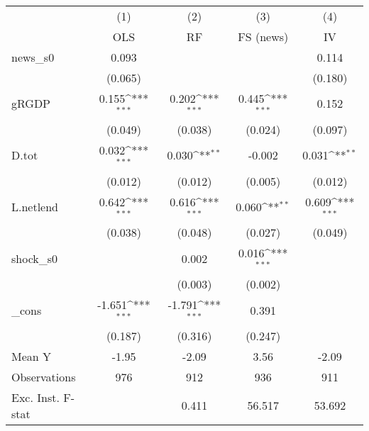 {
\def\sym#1{\ifmmode^{#1}\else\(^{#1}\)\fi}
\begin{tabular}{l*{4}{c}}
\toprule
            &\multicolumn{1}{c}{(1)}&\multicolumn{1}{c}{(2)}&\multicolumn{1}{c}{(3)}&\multicolumn{1}{c}{(4)}\\
            &\multicolumn{1}{c}{OLS}&\multicolumn{1}{c}{RF}&\multicolumn{1}{c}{FS (news)}&\multicolumn{1}{c}{IV}\\
\midrule
news\_s0     &       0.093         &                     &                     &       0.114         \\
            &     (0.065)         &                     &                     &     (0.180)         \\
\addlinespace
gRGDP       &       0.155\sym{***}&       0.202\sym{***}&       0.445\sym{***}&       0.152         \\
            &     (0.049)         &     (0.038)         &     (0.024)         &     (0.097)         \\
\addlinespace
D.tot       &       0.032\sym{***}&       0.030\sym{**} &      -0.002         &       0.031\sym{**} \\
            &     (0.012)         &     (0.012)         &     (0.005)         &     (0.012)         \\
\addlinespace
L.netlend   &       0.642\sym{***}&       0.616\sym{***}&       0.060\sym{**} &       0.609\sym{***}\\
            &     (0.038)         &     (0.048)         &     (0.027)         &     (0.049)         \\
\addlinespace
shock\_s0    &                     &       0.002         &       0.016\sym{***}&                     \\
            &                     &     (0.003)         &     (0.002)         &                     \\
\addlinespace
\_cons      &      -1.651\sym{***}&      -1.791\sym{***}&       0.391         &                     \\
            &     (0.187)         &     (0.316)         &     (0.247)         &                     \\
\midrule
Mean Y      &       -1.95         &       -2.09         &        3.56         &       -2.09         \\
Observations&         976         &         912         &         936         &         911         \\
Exc. Inst. F-stat&                     &       0.411         &      56.517         &      53.692         \\
\bottomrule
\end{tabular}
}
